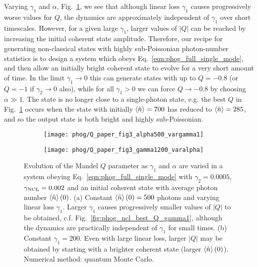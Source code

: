 Varying $\gamma_1$ and $\alpha$, Fig.~\ref{fig:phog_fig3paper2}, we see that although linear loss $\gamma_1$ causes progressively worse values for $Q$, the dynamics are approximately independent of $\gamma_1$ over short timescales. However, for a given large $\gamma_1$, larger values of $\left|Q\right|$ can be reached by increasing the initial coherent state amplitude. Therefore, our recipe for generating non-classical states with highly sub-Poissonian photon-number statistics is to design a system which obeys Eq.~\ref{eqn:phog_full_single_mode}, and then allow an initially bright coherent state to evolve for a very short amount of time. In the limit $\gamma_1 \rightarrow 0$ this can generate states with up to $Q = -0.8$ (or $Q=-1$ if $\gamma_2 \rightarrow 0$ also), while for all $\gamma_1 > 0$ we can force $Q \rightarrow -0.8$ by choosing $\alpha \gg 1$. The state is no longer close to a single-photon state, e.g. the best $Q$ in Fig.~\ref{fig:phog_fig3paper2} occurs when the state with initially $\ev{\hat{n}}=700$ has reduced to $\ev{\hat{n}} = 285$, and so the output state is both bright and highly sub-Poissonian. %

\begin{figure}[htp]
\captionsetup{width=\linewidth}
\centering
	\begin{subfigure}{0.7\linewidth}
	\centering
	\caption{}
	\texttt{[image: phog/Q\_paper\_fig3\_alpha500\_vargamma1]}
	\end{subfigure}
	\begin{subfigure}{0.7\linewidth}
	\centering
	\caption{}
	\texttt{[image: phog/Q\_paper\_fig3\_gamma1200\_varalpha]}
	\end{subfigure}
\caption{\label{fig:phog_fig3paper2} Evolution of the Mandel $Q$ parameter as $\gamma_1$ and $\alpha$ are varied in a system obeying Eq.~\ref{eqn:phog_full_single_mode} with $\gamma_2 = 0.0005$, $\gamma_{\text{NCL}} = 0.002$ and an initial coherent state with average photon number $\ev{\hat{n}}\left(0\right)$. (a) Constant $\ev{\hat{n}}\left(0\right) = 500$ photons and varying linear loss $\gamma_1$. Larger $\gamma_1$ causes progressively smaller values of $\left|Q\right|$ to be obtained, c.f. Fig.~\ref{fig:phog_ncl_best_Q_gamma1}, although the dynamics are practically independent of $\gamma_1$ for small times. (b) Constant $\gamma_1 = 200$. Even with large linear loss, larger $\left|Q\right|$ may be obtained by starting with a brighter coherent state (larger $\ev{\hat{n}}\left(0\right)$). Numerical method: quantum Monte Carlo.}
\end{figure}



